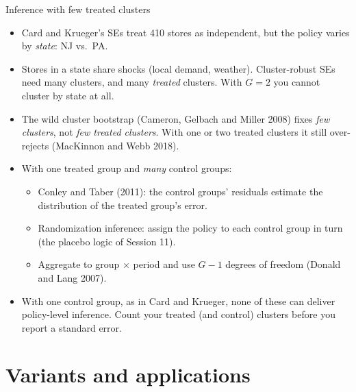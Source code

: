 \documentclass[aspectratio=169,11pt]{beamer}
\begin{document}
\begin{frame}{Inference with few treated clusters}
\small
\begin{itemize}
\item Card and Krueger's SEs treat 410 stores as independent, but the policy varies by \emph{state}: NJ vs.\ PA.
\item Stores in a state share shocks (local demand, weather). Cluster-robust SEs need many clusters, and
many \emph{treated} clusters. With $G = 2$ you cannot cluster by state at all.
\item The wild cluster bootstrap (Cameron, Gelbach and Miller 2008) fixes \emph{few clusters}, not \emph{few treated
clusters}. With one or two treated clusters it still over-rejects (MacKinnon and Webb 2018).
\item With one treated group and \emph{many} control groups:
\begin{itemize}
\item Conley and Taber (2011): the control groups' residuals estimate the distribution of the treated group's error.
\item Randomization inference: assign the policy to each control group in turn (the placebo logic of Session 11).
\item Aggregate to group $\times$ period and use $G-1$ degrees of freedom (Donald and Lang 2007).
\end{itemize}
\item With one control group, as in Card and Krueger, none of these can deliver policy-level inference. Count your
treated (and control) clusters before you report a standard error.
\end{itemize}
\end{frame}


\section{Variants and applications}
\end{document}
